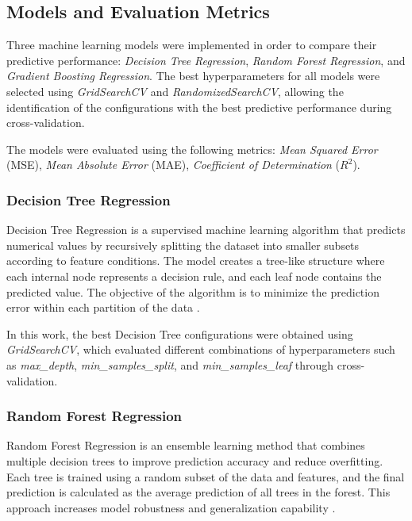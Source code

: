 \documentclass[12pt]{article}
\begin{document}
\subsection{Models and Evaluation Metrics}

Three machine learning models were implemented in order to compare their predictive performance: \textit{Decision Tree Regression}, \textit{Random Forest Regression}, and \textit{Gradient Boosting Regression}. The best hyperparameters for all models were selected using \textit{GridSearchCV} and \textit{RandomizedSearchCV}, allowing the identification of the configurations with the best predictive performance during cross-validation.

The models were evaluated using the following metrics: \textit{Mean Squared Error} (MSE), \textit{Mean Absolute Error} (MAE), \textit{Coefficient of Determination} ($R^2$).

\subsubsection{Decision Tree Regression}

Decision Tree Regression is a supervised machine learning algorithm that predicts numerical values by recursively splitting the dataset into smaller subsets according to feature conditions. The model creates a tree-like structure where each internal node represents a decision rule, and each leaf node contains the predicted value. The objective of the algorithm is to minimize the prediction error within each partition of the data \cite{decision_tree_medium}. 

In this work, the best Decision Tree configurations were obtained using \textit{GridSearchCV}, which evaluated different combinations of hyperparameters such as \textit{max\_depth}, \textit{min\_samples\_split}, and \textit{min\_samples\_leaf} through cross-validation.

\subsubsection{Random Forest Regression}

Random Forest Regression is an ensemble learning method that combines multiple decision trees to improve prediction accuracy and reduce overfitting. Each tree is trained using a random subset of the data and features, and the final prediction is calculated as the average prediction of all trees in the forest. This approach increases model robustness and generalization capability \cite{ibm_random_forest}.
\end{document}

